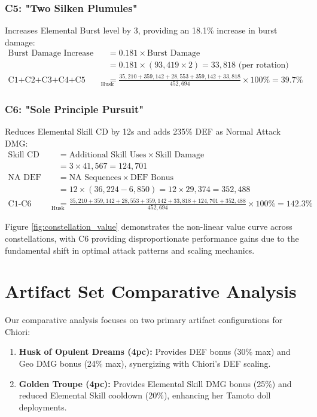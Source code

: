 \documentclass[12pt,a4paper]{article}
\begin{document}
\subsubsection{C5: "Two Silken Plumules"}
Increases Elemental Burst level by 3, providing an 18.1\% increase in burst damage:
\begin{align}
\text{Burst Damage Increase} &= 0.181 \times \text{Burst Damage} \\
&= 0.181 \times (93,419 \times 2) = 33,818 \text{ (per rotation)} \\
\text{C1+C2+C3+C4+C5 Damage Increase}_{\text{Husk}} &= \frac{35,210 + 359,142 + 28,553 + 359,142 + 33,818}{452,694} \times 100\% = 39.7\%
\end{align}

\subsubsection{C6: "Sole Principle Pursuit"}
Reduces Elemental Skill CD by 12s and adds 235\% DEF as Normal Attack DMG:
\begin{align}
\text{Skill CD Reduction Benefit} &= \text{Additional Skill Uses} \times \text{Skill Damage} \\
&= 3 \times 41,567 = 124,701 \\
\text{NA DEF Scaling Benefit} &= \text{NA Sequences} \times \text{DEF Bonus} \\
&= 12 \times (36,224 - 6,850) = 12 \times 29,374 = 352,488 \\
\text{C1-C6 Damage Increase}_{\text{Husk}} &= \frac{35,210 + 359,142 + 28,553 + 359,142 + 33,818 + 124,701 + 352,488}{452,694} \times 100\% = 142.3\%
\end{align}

Figure \ref{fig:constellation_value} demonstrates the non-linear value curve across constellations, with C6 providing disproportionate performance gains due to the fundamental shift in optimal attack patterns and scaling mechanics.

\section{Artifact Set Comparative Analysis}

Our comparative analysis focuses on two primary artifact configurations for Chiori:

\begin{enumerate}
    \item \textbf{Husk of Opulent Dreams (4pc):} Provides DEF bonus (30\% max) and Geo DMG bonus (24\% max), synergizing with Chiori's DEF scaling.
    \item \textbf{Golden Troupe (4pc):} Provides Elemental Skill DMG bonus (25\%) and reduced Elemental Skill cooldown (20\%), enhancing her Tamoto doll deployments.
\end{enumerate}
\end{document}
